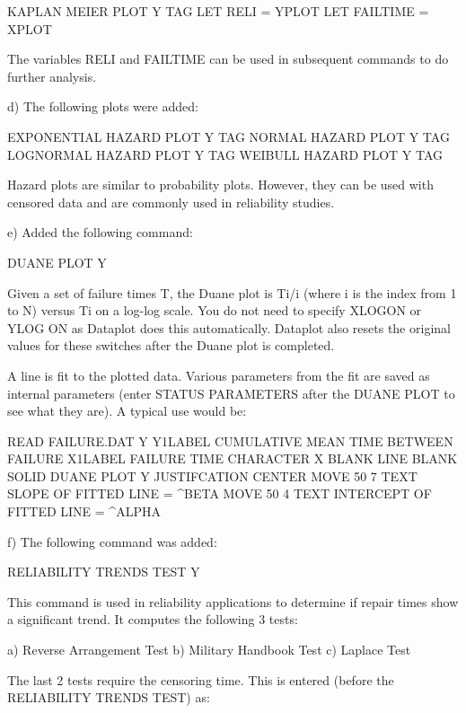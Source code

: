 {          KAPLAN MEIER PLOT Y TAG
          LET RELI = YPLOT
          LET FAILTIME = XPLOT
   
       The variables RELI and FAILTIME can be used in subsequent
       commands to do further analysis.

    d) The following plots were added:

          EXPONENTIAL HAZARD PLOT Y TAG
          NORMAL HAZARD PLOT Y TAG
          LOGNORMAL HAZARD PLOT Y TAG
          WEIBULL HAZARD PLOT Y TAG

       Hazard plots are similar to probability plots.  However,
       they can be used with censored data and are commonly used
       in reliability studies.

    e) Added the following command:

           DUANE PLOT Y
   
       Given a set of failure times T, the Duane plot is 
       Ti/i (where i is the index from 1 to N) versus Ti on
       a log-log scale.  You do not need to specify XLOGON or YLOG ON
       as Dataplot does this automatically.  Dataplot also resets
       the original values for these switches after the Duane plot
       is completed.
   
       A line is fit to the plotted data.  Various parameters from
       the fit are saved as internal parameters (enter
       STATUS PARAMETERS after the DUANE PLOT to see what they are).
       A typical use would be:
   
           READ FAILURE.DAT Y
           Y1LABEL CUMULATIVE MEAN TIME BETWEEN FAILURE
           X1LABEL FAILURE TIME
           CHARACTER X BLANK
           LINE BLANK SOLID
           DUANE PLOT Y
           JUSTIFCATION CENTER
           MOVE 50 7
           TEXT SLOPE OF FITTED LINE = ^BETA 
           MOVE 50 4
           TEXT INTERCEPT OF FITTED LINE = ^ALPHA 

    f) The following command was added:

           RELIABILITY TRENDS TEST Y
   
       This command is used in reliability applications to determine
       if repair times show a significant trend.  It computes the
       following 3 tests:
   
       a) Reverse Arrangement Test
       b) Military Handbook Test
       c) Laplace Test
   
       The last 2 tests require the censoring time.  This is entered
       (before the RELIABILITY TRENDS TEST) as:
   
}
